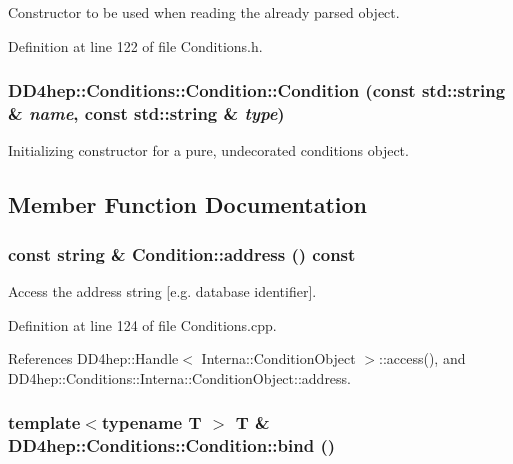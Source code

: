 Constructor to be used when reading the already parsed object. 

Definition at line 122 of file Conditions.h.\hypertarget{class_d_d4hep_1_1_conditions_1_1_condition_a0169d2e5f3d98ac7500b9f612ad21cc9}{
\subsubsection[{Condition}]{\setlength{\rightskip}{0pt plus 5cm}DD4hep::Conditions::Condition::Condition (const std::string \& {\em name}, \/  const std::string \& {\em type})}}
\label{class_d_d4hep_1_1_conditions_1_1_condition_a0169d2e5f3d98ac7500b9f612ad21cc9}


Initializing constructor for a pure, undecorated conditions object. 

\subsection{Member Function Documentation}
\hypertarget{class_d_d4hep_1_1_conditions_1_1_condition_a7bbc628e25bc0f887743ce52f56b07cb}{
\subsubsection[{address}]{\setlength{\rightskip}{0pt plus 5cm}const {\bf string} \& Condition::address () const}}
\label{class_d_d4hep_1_1_conditions_1_1_condition_a7bbc628e25bc0f887743ce52f56b07cb}


Access the address string \mbox{[}e.g. database identifier\mbox{]}. 

Definition at line 124 of file Conditions.cpp.

References DD4hep::Handle$<$ Interna::ConditionObject $>$::access(), and DD4hep::Conditions::Interna::ConditionObject::address.\hypertarget{class_d_d4hep_1_1_conditions_1_1_condition_a5e287f594f3d14d6a6870be8c34b65cc}{
\subsubsection[{bind}]{\setlength{\rightskip}{0pt plus 5cm}template$<$typename T $>$ {\bf T} \& DD4hep::Conditions::Condition::bind ()}}
\label{class_d_d4hep_1_1_conditions_1_1_condition_a5e287f594f3d14d6a6870be8c34b65cc}


